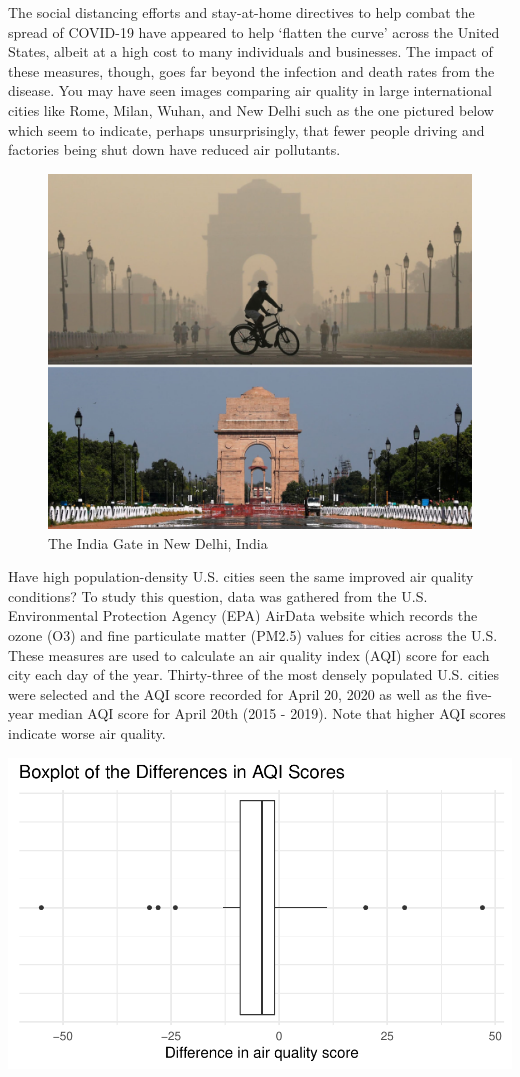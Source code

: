 \documentclass[
]{report}
\begin{document}
The social distancing efforts and stay-at-home directives to help combat the spread of COVID-19 have appeared to help `flatten the curve' across the United States, albeit at a high cost to many individuals and businesses. The impact of these measures, though, goes far beyond the infection and death rates from the disease. You may have seen images comparing air quality in large international cities like Rome, Milan, Wuhan, and New Delhi such as the one pictured below which seem to indicate, perhaps unsurprisingly, that fewer people driving and factories being shut down have reduced air pollutants.

\begin{figure}

{\centering \includegraphics[width=0.6\linewidth]{images/air_pollution} 

}

\caption{The India Gate in New Delhi, India}\label{fig:unnamed-chunk-1}
\end{figure}

Have high population-density U.S. cities seen the same improved air quality conditions? To study this question, data was gathered from the U.S. Environmental Protection Agency (EPA) AirData website which records the ozone (O3) and fine particulate matter (PM2.5) values for cities across the U.S. These measures are used to calculate an air quality index (AQI) score for each city each day of the year. Thirty-three of the most densely populated U.S. cities were selected and the AQI score recorded for April 20, 2020 as well as the five-year median AQI score for April 20th (2015 - 2019). Note that higher AQI scores indicate worse air quality.

\begin{center}\includegraphics[width=0.6\linewidth]{08-paired_files/figure-latex/unnamed-chunk-3-1} \end{center}
\end{document}
